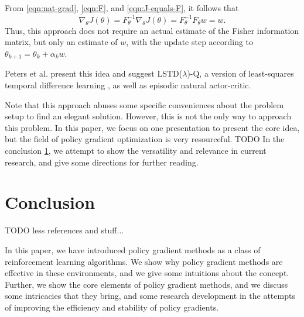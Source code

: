 From \eqref{eqn:nat-grad}, \eqref{eqn:F}, and \eqref{eqn:J-equals-F}, it follows that
\begin{equation}
  \widetilde{\nabla}_\theta J(\theta) = F^{-1}_\theta \nabla_\theta J(\theta) = F_\theta^{-1} F_\theta w = w.
\end{equation}
Thus, this approach does not require an actual estimate of the Fisher information matrix, but only an estimate of $w$, with the update step according to $\theta_{k+1} = \theta_k + \alpha_k w$.

Peters et al. \cite{4863} present this idea and suggest LSTD($\lambda$)-Q, a version of least-squares temporal difference learning  \cite{Boyan:1999:LTD:645528.657618}, as well as episodic natural actor-critic.

Note that this approach abuses some specific conveniences about the problem setup to find an elegant solution. However, this is not the only way to approach this problem. In this paper, we focus on one presentation to present the core idea, but the field of policy gradient optimization is very resourceful. TODO In the conclusion \ref{sec:outro}, we attempt to show the versatility and relevance in current research, and give some directions for further reading.

\section{Conclusion}
\label{sec:outro}

TODO less references and stuff...

In this paper, we have introduced policy gradient methods as a class of reinforcement learning algorithms. We show why policy gradient methods are effective in these environments, and we give some intuitions about the concept. Further, we show the core elements of policy gradient methods, and we discuss some intricacies that they bring, and some research development in the attempts of improving the efficiency and stability of policy gradients.

